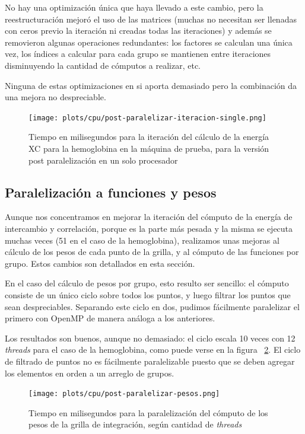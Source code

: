 No hay una optimizaci\'on \'unica que haya llevado a este cambio, pero la
reestructuraci\'on mejor\'o el uso de las matrices (muchas no necesitan ser
llenadas con ceros previo la iteraci\'on ni creadas todas las iteraciones) y
adem\'as se removieron algunas operaciones redundantes: los factores se calculan
una \'unica vez, los \'indices a calcular para cada grupo se mantienen entre
iteraciones disminuyendo la cantidad de c\'omputos a realizar, etc.

Ninguna de estas optimizaciones en si aporta demasiado pero la combinaci\'on
da una mejora no despreciable.

\begin{figure}[htbp]
   \centering
   \texttt{[image: plots/cpu/post-paralelizar-iteracion-single.png]}
   \caption{Tiempo en milisegundos para la iteraci\'on del c\'alculo de la energ\'ia
   XC para la hemoglobina en la m\'aquina de prueba, para la versi\'on
   post paralelizaci\'on en un solo procesador}
   \label{fig:post-paralelizacion-single}
\end{figure}

\subsection{Paralelizaci\'on a funciones y pesos}

Aunque nos concentramos en mejorar la iteraci\'on del c\'omputo de la energ\'ia
de intercambio y correlaci\'on, porque es la parte m\'as pesada y la misma se
ejecuta muchas veces (51 en el caso de la hemoglobina), realizamos unas mejoras
al c\'alculo de los pesos de cada punto de la grilla, y al c\'omputo de
las funciones por grupo. Estos cambios son detallados en esta secci\'on.

En el caso del c\'alculo de pesos por grupo, esto resulto ser sencillo: el
c\'omputo consiste de un \'unico ciclo sobre todos los puntos, y luego filtrar los
puntos que sean despreciables. Separando este ciclo en dos, pudimos f\'acilmente
paralelizar el primero con OpenMP de manera an\'aloga a los anteriores.

Los resultados son buenos, aunque no demasiado: el ciclo escala 10 veces con 12
\textit{threads} para el caso de la hemoglobina, como puede verse en la figura
~\ref{fig:weights-paralelizado}. El ciclo de filtrado de puntos no es f\'acilmente
paralelizable puesto que se deben agregar los elementos en orden a un arreglo
de grupos.

\begin{figure}[htbp]
   \centering
   \texttt{[image: plots/cpu/post-paralelizar-pesos.png]}
   \caption{Tiempo en milisegundos para la paralelizaci\'on del c\'omputo de los pesos
    de la grilla de integraci\'on, seg\'un cantidad de \textit{threads}}
   \label{fig:weights-paralelizado}
\end{figure}

